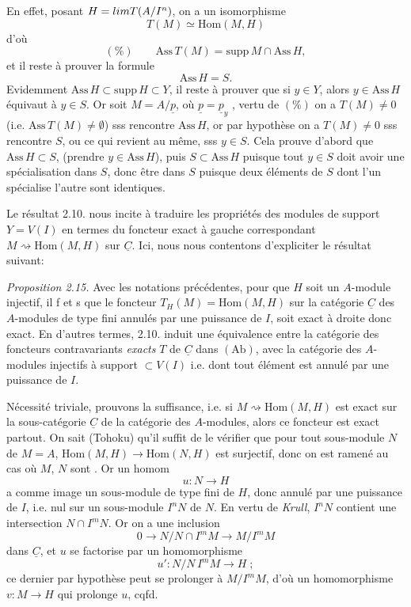 \documentclass[11pt,a4paper]{article}
\begin{document}
En effet, posant $H = \varinjlim T(A/I^n)$, on a un isomorphisme
\[
  T(M) \simeq \mathrm{Hom}(M,H)
\]
d'où
\[
  (\%) \qquad \mathrm{Ass}\, T(M) = \mathrm{supp}\, M \cap \mathrm{Ass}\, H ,
\]
et il reste à prouver la formule
\[
  \mathrm{Ass}\, H = S .
\]
 Evidemment $\mathrm{Ass}\, H \subset \mathrm{supp}\, H \subset Y$, il reste à prouver que si $y \in Y$, alors $y \in \mathrm{Ass}\, H$ équivaut à $y \in S$. Or soit $M = A/\underline{p}$, où $\underline{p} = \underline{p}_y$ ,  vertu de $(\%)$ on a $T(M) \neq 0$ (i.e. $\mathrm{Ass}\, T(M) \neq \emptyset$) sss  \struck{\ill{}} rencontre  $\mathrm{Ass}\, H$, or par hypothèse on a $T(M) \neq 0$ sss   rencontre \struck{\ill{}} $S$, ou ce qui revient au même, sss $y \in S$.  Cela prouve d'abord que $\mathrm{Ass}\, H \subset S$, (prendre $y \in \mathrm{Ass}\, H$), puis $S \subset \mathrm{Ass}\, H$ puisque tout $y \in S$ doit avoir une spécialisation dans $S$, donc être dans $S$ puisque deux éléments de $S$ dont \struck{\ill{}} l'un spécialise l'autre sont identiques.

Le résultat 2.10. nous incite à traduire les propriétés des modules  de support $Y = V(I)$ en termes du foncteur exact à gauche correspondant $M \rightsquigarrow \mathrm{Hom}(M,H)$ sur $\underline{C}$. Ici, nous nous contentons d'expliciter le résultat suivant:

\emph{Proposition 2.15.} Avec les notations précédentes, pour que $H$ soit un $A$-module injectif, il f et s que le foncteur $T_H(M) = \mathrm{Hom}(M,H)$ sur la catégorie $\underline{C}$ des $A$-modules de type fini  annulés par une puissance de $I$, soit exact à droite donc exact. En d'autres termes, 2.10. induit une équivalence entre la catégorie des foncteurs contravariants \emph{exacts} $T$ de $\underline{C}$ dans $(\mathrm{Ab})$, avec la catégorie des $A$-modules injectifs à support $\subset V(I)$ i.e. dont tout élément est annulé par une puissance de $I$.

Nécessité triviale, prouvons la suffisance, i.e. si $M \rightsquigarrow \mathrm{Hom}(M,H)$ est exact sur la sous-catégorie $\underline{C}$ de la catégorie des $A$-modules, alors ce foncteur est exact partout. On sait (Tohoku) qu'il suffit de le vérifier que pour tout sous-module $N$ de $M = A$, $\mathrm{Hom}(M,H) \to \mathrm{Hom}(N,H)$ est surjectif, donc on est ramené au cas où $M$, $N$ sont  . Or un homom
\[
  u : N \longrightarrow H
\]
a comme image un sous-module de type fini de $H$, donc annulé par une puissance de $I$, i.e.  nul sur un sous-module $I^n N$ de $N$. En vertu de \emph{Krull}, $I^n N$ contient une intersection $N \cap I^m N$. Or on a une inclusion
\[
  0 \longrightarrow N/N \cap I^m M \longrightarrow M/I^m M
\]
dans $\underline{C}$, et $u$ se factorise par un homomorphisme
\[
  u' : N/N\, I^m M \longrightarrow H \; ;
\]
ce dernier par hypothèse peut se prolonger à $M/I^m M$, d'où un homomorphisme $v : M \to H$ qui prolonge $u$, cqfd.
\end{document}
